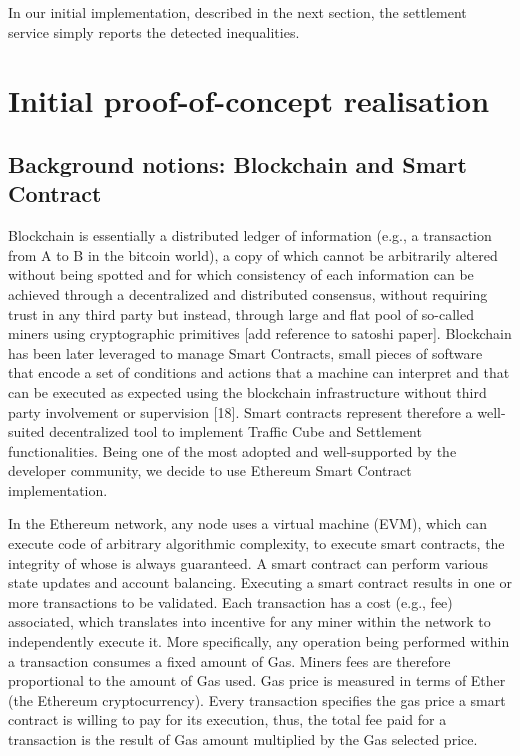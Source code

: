 \documentclass[chi_draft]{sigchi}
\begin{document}
In our initial implementation, described in the next section, the settlement service simply reports the detected inequalities.

\section{Initial proof-of-concept realisation}  \label{eq:realisation}


\subsection{Background notions: Blockchain and Smart Contract}  \label{sec:blockchain}
Blockchain is essentially a distributed ledger of information (e.g., a transaction from A to B in the bitcoin world), a copy of which cannot be arbitrarily altered without being spotted and for which consistency of each information can be achieved through a decentralized and distributed consensus, without requiring trust in any third party but instead, through large and flat pool of so-called miners using cryptographic primitives [add reference to satoshi paper].
Blockchain has been later leveraged to manage Smart Contracts, small pieces of software that encode a set of conditions and actions that a machine can interpret and that can be executed as expected using the blockchain infrastructure without third party involvement or supervision [18]. Smart contracts represent therefore a well-suited decentralized tool to implement Traffic Cube and Settlement functionalities. Being one of the most adopted and well-supported by the developer community, we decide to use Ethereum Smart Contract implementation.

In the Ethereum network, any node uses a virtual machine (EVM), which can execute code of arbitrary algorithmic complexity, to execute smart contracts, the integrity of whose is always guaranteed. A smart contract can perform various state updates and account balancing.  
Executing a smart contract results in one or more transactions to be validated. Each transaction has a cost (e.g., fee) associated, which translates into incentive for any miner within the network to independently execute it. 
More specifically, any operation being performed within a transaction consumes a fixed amount of Gas. Miners fees are therefore proportional to the amount of Gas used. Gas price is measured in terms of Ether (the Ethereum cryptocurrency). Every transaction specifies the gas price a smart contract is willing to pay for its execution, thus, the total fee paid for a transaction is the result of Gas amount multiplied by the Gas selected price.
\end{document}
